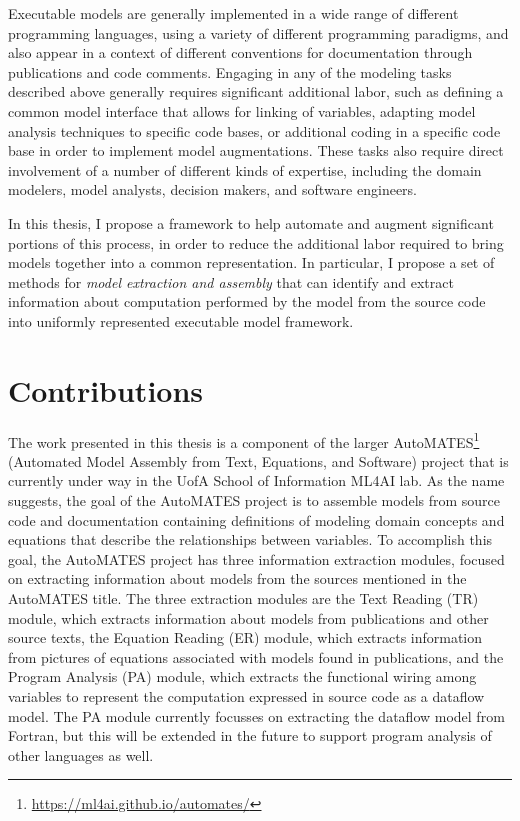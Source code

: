 Executable models are generally implemented in a wide range of different programming languages, using a variety of different programming paradigms, and also appear in a context of different conventions for documentation through publications and code comments. Engaging in any of the modeling tasks described above generally requires significant additional labor, such as defining a common model interface that allows for linking of variables, adapting model analysis techniques to specific code bases, or additional coding in a specific code base in order to implement model augmentations. These tasks also require direct involvement of a number of different kinds of expertise, including the domain modelers, model analysts, decision makers, and software engineers.

In this thesis, I propose a framework to help automate and augment significant portions of this process, in order to reduce the additional labor required to bring models together into a common representation.
In particular, I propose a set of methods for \textit{model extraction and assembly} that can identify and extract information about computation performed by the model from the source code into uniformly represented executable model framework.

\section{Contributions\label{sec:contributions}}
The work presented in this thesis is a component of the larger AutoMATES\footnote{\url{https://ml4ai.github.io/automates/}} (Automated Model Assembly from Text, Equations, and Software) project \citep{pyarelal2019} that is currently under way in the UofA School of Information ML4AI lab.
As the name suggests, the goal of the AutoMATES project is to assemble models from source code and documentation containing definitions of modeling domain concepts and equations that describe the relationships between variables.
To accomplish this goal, the AutoMATES project has three information extraction modules, focused on extracting information about models from the sources mentioned in the AutoMATES title.
The three extraction modules are the Text Reading (TR) module, which extracts information about models from publications and other source texts, the Equation Reading (ER) module, which extracts information from pictures of equations associated with models found in publications, and the Program Analysis (PA) module, which extracts the functional wiring among variables to represent the computation expressed in source code as a dataflow model. The PA module currently focusses on extracting the dataflow model from Fortran, but this will be extended in the future to support program analysis of other languages as well.

